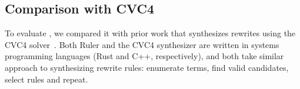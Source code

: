 




\subsection{Comparison with CVC4}
\label{sec:ruler-eval}

To evaluate ,
 we compared it with prior work that synthesizes rewrites using the
 CVC4 solver~\cite{sat19}.
Both Ruler and the CVC4 synthesizer
 are written in systems programming languages
 (Rust and C++, respectively),
 and both take similar approach to
 synthesizing rewrite rules:
  enumerate terms,
  find valid candidates,
  select rules and repeat.

